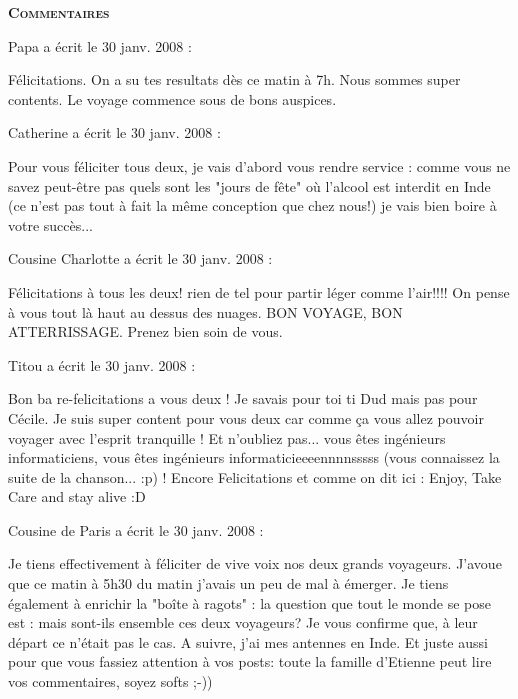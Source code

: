 \bigskip
\textbf{\textsc{Commentaires}}

\medskip
Papa a écrit le 30 janv. 2008 :
\begin{displayquote}
Félicitations. On a su tes resultats dès ce matin à 7h. Nous sommes super contents. Le voyage commence sous de bons auspices.
\end{displayquote}

\medskip
Catherine a écrit le 30 janv. 2008 :
\begin{displayquote}
Pour vous féliciter tous deux, je vais d'abord vous rendre service : comme vous ne savez peut-être pas quels sont les "jours de fête" où l'alcool est interdit en Inde (ce n'est pas tout à fait la même conception que chez nous!) je vais bien boire à votre succès...
\end{displayquote}

\medskip
Cousine Charlotte a écrit le 30 janv. 2008 :
\begin{displayquote}
Félicitations à tous les deux! rien de tel pour partir léger comme l'air!!!! On pense à vous tout là haut au dessus des nuages. BON VOYAGE, BON ATTERRISSAGE. Prenez bien soin de vous.
\end{displayquote}

\medskip
Titou a écrit le 30 janv. 2008 :
\begin{displayquote}
Bon ba re-felicitations a vous deux ! Je savais pour toi ti Dud mais pas pour Cécile. Je suis super content pour vous deux car comme ça vous allez pouvoir voyager avec l'esprit tranquille ! Et n'oubliez pas... vous êtes ingénieurs informaticiens, vous êtes ingénieurs informaticieeeennnnsssss (vous connaissez la suite de la chanson... :p) ! Encore Felicitations et comme on dit ici : Enjoy, Take Care and stay alive :D
\end{displayquote}

\medskip
Cousine de Paris a écrit le 30 janv. 2008 :
\begin{displayquote}
Je tiens effectivement à féliciter de vive voix nos deux grands voyageurs. J'avoue que ce matin à 5h30 du matin j'avais un peu de mal à émerger.
Je tiens également à enrichir la "boîte à ragots" : la question que tout le monde se pose est : mais sont-ils ensemble ces deux voyageurs? Je vous confirme que, à leur départ ce n'était pas le cas. A suivre, j'ai mes antennes en Inde.
Et juste aussi pour que vous fassiez attention à vos posts: toute la famille d'Etienne peut lire vos commentaires, soyez softs ;-))
\end{displayquote}


